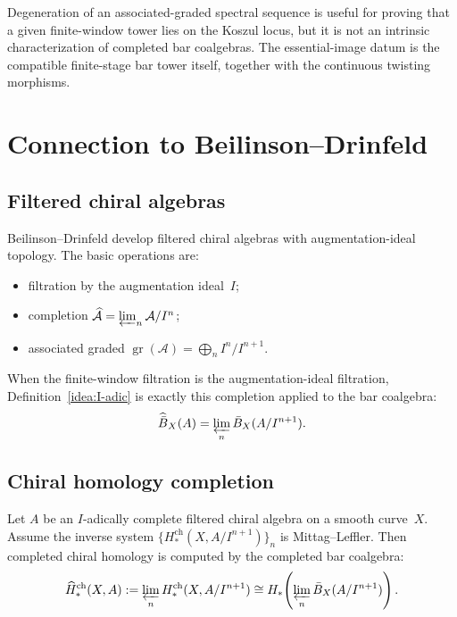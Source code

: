 \begin{remark}\label{rem:koszul-dual-characterization-window}
Degeneration of an associated-graded spectral sequence is useful for
proving that a given finite-window tower lies on the Koszul locus, but
it is not an intrinsic characterization of completed bar coalgebras.
The essential-image datum is the compatible finite-stage bar tower
itself, together with the continuous twisting morphisms.
\end{remark}

\section{Connection to Beilinson--Drinfeld}

\subsection{Filtered chiral algebras}

\begin{remark}[BD framework]\label{rem:BD-filtered}
Beilinson--Drinfeld develop filtered chiral algebras with
augmentation-ideal topology.  The basic operations are:

\begin{itemize}
\item filtration by the augmentation ideal~$I$;
\item completion
 $\widehat{\mathcal{A}}=\varprojlim_n\mathcal{A}/I^n$;
\item associated graded
 $\operatorname{gr}(\mathcal{A})=\bigoplus_n I^n/I^{n+1}$.
\end{itemize}
When the finite-window filtration is the augmentation-ideal
filtration, Definition~\ref{idea:I-adic} is exactly this completion
applied to the bar coalgebra:
\[
\widehat{\bar B}_X(A)=\varprojlim_n\bar B_X(A/I^{n+1}).
\]
\end{remark}

\subsection{Chiral homology completion}

\begin{theorem}\label{thm:BD-chiral-homology}
Let $A$ be an $I$-adically complete filtered chiral algebra on a
smooth curve~$X$.  Assume the inverse system
$\{H_*^{\mathrm{ch}}(X,A/I^{n+1})\}_n$ is Mittag--Leffler.  Then
completed chiral homology is computed by the completed bar coalgebra:
\[
\widehat H_*^{\mathrm{ch}}(X,A)
:=
\varprojlim_n H_*^{\mathrm{ch}}(X,A/I^{n+1})
\cong
H_*\!\left(\varprojlim_n\bar B_X(A/I^{n+1})\right).
\]
\end{theorem}

